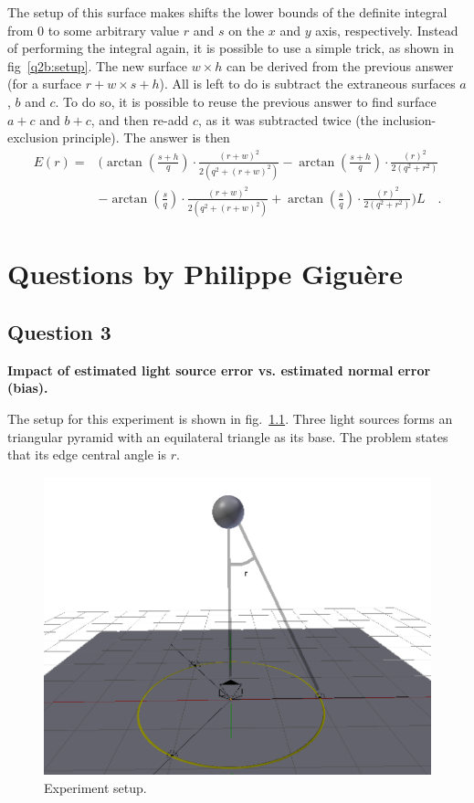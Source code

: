 \documentclass{report}
\begin{document}
The setup of this surface makes shifts the lower bounds of the definite integral from $0$ to some arbitrary value $r$ and $s$ on the $x$ and $y$ axis, respectively. Instead of performing the integral again, it is possible to use a simple trick, as shown in fig~\ref{q2b:setup}. The new surface $w \times h$ can be derived from the previous answer (for a surface $r+w \times s+h$). All is left to do is subtract the extraneous surfaces $a$, $b$ and $c$. To do so, it is possible to reuse the previous answer to find surface $a+c$ and $b+c$, and then re-add $c$, as it was subtracted twice (the inclusion-exclusion principle). The answer is then
\begin{align*}
E(r) =& \biggl( \arctan\left(\frac{s+h}{q}\right) \cdot \frac{\left(r+w\right)^2}{2 \left(q^2 + \left(r+w\right)^2\right)}
- \arctan\left(\frac{s+h}{q}\right) \cdot \frac{\left(r\right)^2}{2 \left(q^2 + r^2\right)} \\
&- \arctan\left(\frac{s}{q}\right) \cdot \frac{\left(r+w\right)^2}{2 \left(q^2 + \left(r+w\right)^2\right)}
+ \arctan\left(\frac{s}{q}\right) \cdot \frac{\left(r\right)^2}{2 \left(q^2 + r^2\right)} \biggr) L
\quad.
\end{align*}

\chapter{Questions by Philippe Giguère}

\section{Question 3}

\textbf{Impact of estimated light source error vs. estimated normal error (bias).}

The setup for this experiment is shown in fig.~\ref{q3:setup}. Three light sources forms an triangular pyramid with an equilateral triangle as its base. The problem states that its edge central angle is $r$.

\begin{figure}
  \centering
  \includegraphics[width=0.9\linewidth]{q3_setup.png}
  \caption[Experiment setup]
   {Experiment setup.}
  \label{q3:setup}
\end{figure}
\end{document}
